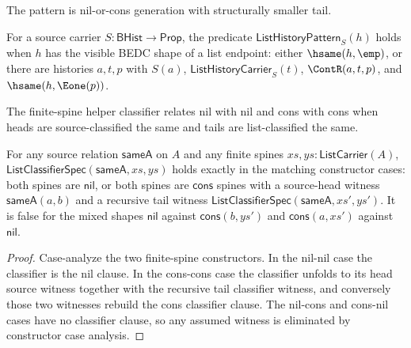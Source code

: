 \begin{definition}
\label{def:list-pattern-specification}
The pattern is nil-or-cons generation with structurally smaller tail.
\end{definition}

\begin{definition}
\label{def:list-history-pattern}
For a source carrier $S:\mathsf{BHist}\to\mathsf{Prop}$, the predicate
$\mathsf{ListHistoryPattern}_S(h)$ holds when $h$ has the visible BEDC shape of
a list endpoint: either $\hsame(h,\emp)$, or there are histories $a,t,p$ with
$S(a)$, $\mathsf{ListHistoryCarrier}_S(t)$, $\ContR(a,t,p)$, and
$\hsame(h,\Eone(p))$.
\end{definition}

\begin{definition}
\label{def:list-classifier-specification}
The finite-spine helper classifier relates nil with nil and cons with cons when heads are source-classified the same and tails are list-classified the same.
\end{definition}

\begin{theorem}
\label{thm:list-classifier-case-exactness}
For any source relation $\mathsf{sameA}$ on $A$ and any finite spines $xs,ys : \mathsf{ListCarrier}(A)$, $\mathsf{ListClassifierSpec}(\mathsf{sameA},xs,ys)$ holds exactly in the matching constructor cases: both spines are $\mathsf{nil}$, or both spines are $\mathsf{cons}$ spines with a source-head witness $\mathsf{sameA}(a,b)$ and a recursive tail witness $\mathsf{ListClassifierSpec}(\mathsf{sameA},xs',ys')$. It is false for the mixed shapes $\mathsf{nil}$ against $\mathsf{cons}(b,ys')$ and $\mathsf{cons}(a,xs')$ against $\mathsf{nil}$.
\end{theorem}
\begin{proof}
Case-analyze the two finite-spine constructors. In the nil-nil case the classifier is the nil clause. In the cons-cons case the classifier unfolds to its head source witness together with the recursive tail classifier witness, and conversely those two witnesses rebuild the cons classifier clause. The nil-cons and cons-nil cases have no classifier clause, so any assumed witness is eliminated by constructor case analysis.
\end{proof}

